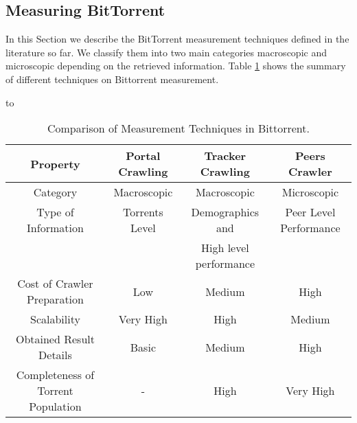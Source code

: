 \subsection{Measuring BitTorrent}
In this Section we describe the BitTorrent measurement techniques defined in the literature so far. 
We classify them into two main categories macroscopic and microscopic depending on the retrieved information. 
Table \ref{tab:measurementtechniques} shows the summary of different techniques on Bittorrent measurement. 

\begin{table}[thb]
\caption{Comparison of Measurement Techniques in Bittorrent.}
\label{tab:measurementtechniques}
\hbox to\hsize{\hfil}
\begin{tabular}{c|c|c|c}\hline\hline
Property & Portal Crawling & Tracker Crawling & Peers Crawler \\ \hline
Category & Macroscopic & Macroscopic & Microscopic \\ \hline
Type of Information & Torrents Level & Demographics and  & Peer Level Performance \\ 
 &  & High level performance  & \\ \hline
Cost of Crawler Preparation & Low & Medium & High \\ \hline
Scalability & Very High & High & Medium \\ \hline
Obtained Result Details & Basic & Medium & High \\ \hline
Completeness of Torrent Population & - & High & Very High \\ \hline
\end{tabular}
\end{table}

